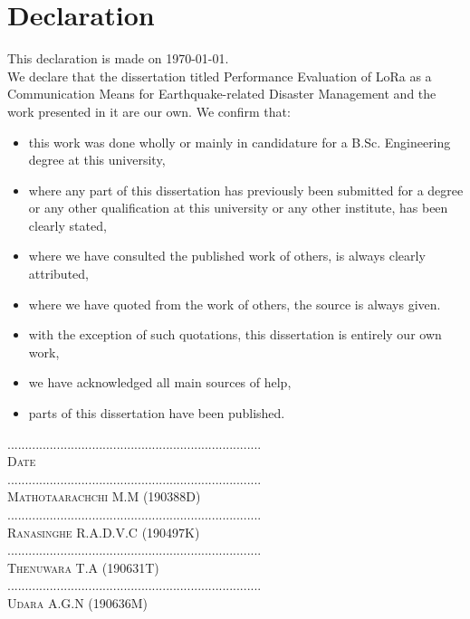 \documentclass[12pt]{report}
\newcommand{\projtitle}{Performance Evaluation of LoRa as a Communication Means for Earthquake-related Disaster Management }
\newcommand{\memberone}{Mathotaarachchi M.M }
\newcommand{\membertwo}{Ranasinghe R.A.D.V.C }
\newcommand{\memberthree}{Thenuwara T.A}
\newcommand{\memberfour}{Udara A.G.N}
\newcommand{\memberoneid}{190388D}
\newcommand{\membertwoid}{190497K}
\newcommand{\memberthreeid}{190631T}
\newcommand{\memberfourid}{190636M}
\begin{document}
\newpage
\section*{Declaration}

This declaration is made on \today.
\\[.25cm]

We declare that the dissertation titled \projtitle and the work presented in it are our own. We confirm that:
\begin{itemize}
	\item this work was done wholly or mainly in candidature for a B.Sc.
	Engineering degree at this
	university,
	\item where any part of this dissertation has previously been submitted for a degree or any other
	qualification at this university or any other institute, has been clearly stated,
	\item  where we have consulted the published work of others, is always clearly attributed,
	\item  where we have quoted from the work of others, the source is always given.
	\item with the exception of such quotations, this dissertation is entirely our own work,
	\item  we have acknowledged all main sources of help,
	\item  parts of this dissertation have been published.
\end{itemize}

\vspace{1cm}
	\begin{minipage}{.3\textwidth}
		........................................................................ \\
		\textsc{Date}\\[1cm]
		........................................................................ \\
		\textsc{\memberone}  (\memberoneid) \\[1cm]
		........................................................................ \\
		\textsc{\membertwo}  (\membertwoid) \\[1cm]
		........................................................................ \\
		\textsc{\memberthree} (\memberthreeid) \\[1cm]
		........................................................................ \\
		\textsc{\memberfour} (\memberfourid) \\[1cm]
		
	\end{minipage}
	
\end{document}
